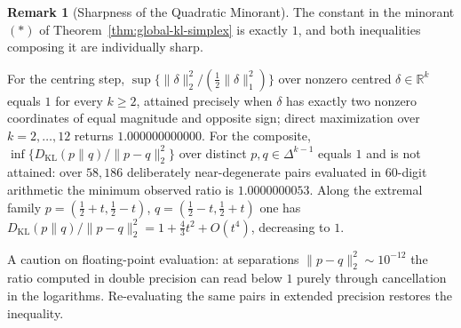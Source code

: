 \documentclass[12pt]{article}
\theoremstyle{definition}
\newtheorem{remark}[theorem]{Remark}
\begin{document}
\begin{remark}[Sharpness of the Quadratic Minorant]
\label{rem:kl-minorant-sharp}
The constant in the minorant $(*)$ of Theorem~\ref{thm:global-kl-simplex} is
exactly $1$, and both inequalities composing it are individually sharp.

For the centring step, $\sup\{\|\delta\|_2^2/(\tfrac12\|\delta\|_1^2)\}$ over
nonzero centred $\delta\in\mathbb R^k$ equals $1$ for every $k\ge2$, attained
precisely when $\delta$ has exactly two nonzero coordinates of equal magnitude
and opposite sign; direct maximization over $k=2,\dots,12$ returns
$1.000000000000$.  For the composite, $\inf\{D_{\mathrm{KL}}(p\|q)/
\|p-q\|_2^2\}$ over distinct $p,q\in\Delta^{k-1}$ equals $1$ and is not
attained: over $58{,}186$ deliberately near-degenerate pairs evaluated in
$60$-digit arithmetic the minimum observed ratio is $1.0000000053$.  Along the
extremal family $p=(\tfrac12+t,\tfrac12-t)$, $q=(\tfrac12-t,\tfrac12+t)$ one
has $D_{\mathrm{KL}}(p\|q)/\|p-q\|_2^2=1+\tfrac43t^2+O(t^4)$, decreasing to $1$.

A caution on floating-point evaluation: at separations $\|p-q\|_2^2\sim10^{-12}$
the ratio computed in double precision can read below $1$ purely through
cancellation in the logarithms.  Re-evaluating the same pairs in extended
precision restores the inequality.
\end{remark}
\end{document}
